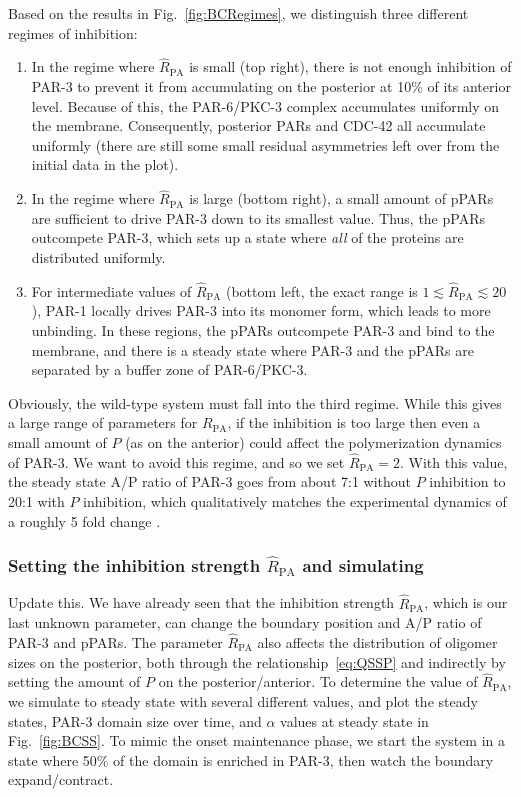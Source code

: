 \documentclass[11pt]{article}
\newcommand{\red}[1]{\color{red}#1\normalcolor}
\newcommand{\6}[1]{#1_{\text{6}}}
\newcommand{\3}[1]{#1_{\text{3}}}
\begin{document}
Based on the results in Fig.\ \ref{fig:BCRegimes}, we distinguish three different regimes of inhibition:
\begin{enumerate}
\item In the regime where $\hat R_\text{PA}$ is small (top right), there is not enough inhibition of PAR-3 to prevent it from accumulating on the posterior at 10\% of its anterior level. Because of this, the PAR-6/PKC-3 complex accumulates uniformly on the membrane. Consequently, posterior PARs and CDC-42 all accumulate uniformly (there are still some small residual asymmetries left over from the initial data in the plot). 
\item In the regime where $\hat R_\text{PA}$ is large (bottom right), a small amount of pPARs are sufficient to drive PAR-3 down to its smallest value. Thus, the pPARs outcompete PAR-3, which sets up a state where \emph{all} of the proteins are distributed uniformly. 
\item For intermediate values of $\hat R_\text{PA}$ (bottom left, the exact range is $1 \lesssim \hat R_\text{PA} \lesssim 20$), PAR-1 locally drives PAR-3 into its monomer form, which leads to more unbinding. In these regions, the pPARs outcompete PAR-3 and bind to the membrane, and there is a steady state where PAR-3 and the pPARs are separated by a buffer zone of PAR-6/PKC-3.
\end{enumerate}
Obviously, the wild-type system must fall into the third regime. While this gives a large range of parameters for $R_\text{PA}$, if the inhibition is too large then even a small amount of $P$ (as on the anterior) could affect the polymerization dynamics of PAR-3. We want to avoid this regime, and so we set $\hat R_\text{PA}=2$. With this value, the steady state A/P ratio of PAR-3 goes from about 7:1 without $P$ inhibition to 20:1 with $P$ inhibition, which qualitatively matches the experimental dynamics of a roughly 5 fold change \cite[Fig.~4c]{sailer2015dynamic}. 

\subsubsection{Setting the inhibition strength $\hat R_\text{PA}$ and simulating}
\red{Update this.} We have already seen that the inhibition strength $\hat R_\text{PA}$, which is our last unknown parameter, can change the boundary position and A/P ratio of PAR-3 and pPARs. The parameter $\hat R_\text{PA}$ also affects the distribution of oligomer sizes on the posterior, both through the relationship\ \eqref{eq:QSSP} and indirectly by setting the amount of $P$ on the posterior/anterior. To determine the value of $\hat R_\text{PA}$, we simulate to steady state with several different values, and plot the steady states, PAR-3 domain size over time, and $\alpha$ values at steady state in Fig.\ \ref{fig:BCSS}. To mimic the onset maintenance phase, we start the system in a state where 50\% of the domain is enriched in PAR-3, then watch the boundary expand/contract.
\end{document}
